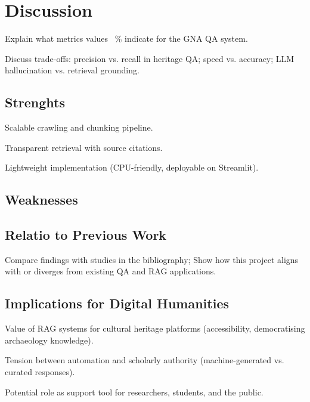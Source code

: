 \chapter{Discussion}
\label{chap:discussion}
\begin{spacing}{1.5}

Explain what metrics values ~\% indicate for the GNA QA system.

Discuss trade-offs: precision vs. recall in heritage QA; speed vs. accuracy; LLM hallucination vs. retrieval grounding.

\section{Strenghts}
Scalable crawling and chunking pipeline.

Transparent retrieval with source citations.

Lightweight implementation (CPU-friendly, deployable on Streamlit).

\section{Weaknesses}

\section{Relatio to Previous Work}
Compare findings with studies in the bibliography; Show how this project aligns with or diverges from existing QA and RAG applications.

\section{Implications for Digital Humanities}
Value of RAG systems for cultural heritage platforms (accessibility, democratising archaeology knowledge).

Tension between automation and scholarly authority (machine-generated vs. curated responses).

Potential role as support tool for researchers, students, and the public.

\end{spacing}